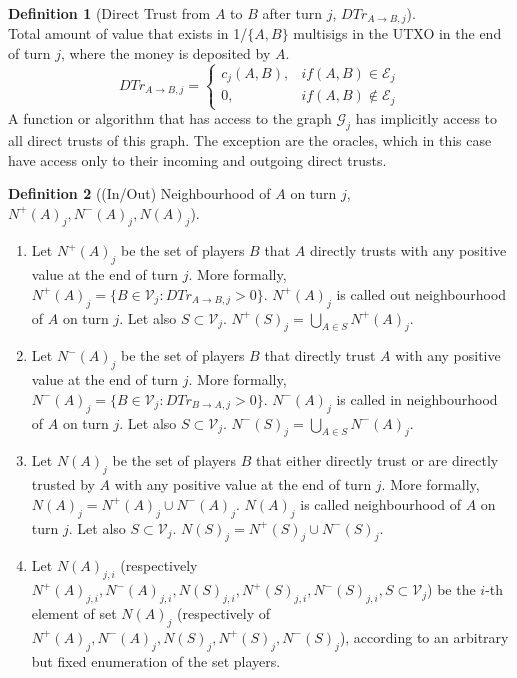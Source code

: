 \documentclass[11pt]{article}
\theoremstyle{definition}
\newtheorem{definition}{Definition}[section]
\theoremstyle{corollary}
\theoremstyle{lemma}
\begin{document}
      \begin{definition}[Direct Trust from $A$ to $B$ after turn $j$, $DTr_{A \rightarrow B, j}$] \ \\
         Total amount of value that exists in 1/$\{A,B\}$ multisigs in the UTXO in the end of turn $j$, where the money is
         deposited by $A$.
         $$DTr_{A \rightarrow B, j} =
            \begin{cases}
               c_j(A, B), & if (A, B) \in \mathcal{E}_j \\
               0, & if (A, B) \notin \mathcal{E}_j
            \end{cases}$$
         A function or algorithm that has access to the graph $\mathcal{G}_j$ has implicitly access to all direct trusts
         of this graph. The exception are the oracles, which in this case have access only to their incoming and outgoing
         direct trusts.
      \end{definition}
      \begin{definition}[(In/Out) Neighbourhood of $A$ on turn $j$, $N^{+}(A)_j, N^{-}(A)_j, N(A)_j$] \ 
         \begin{enumerate}
            \item Let $N^{+}(A)_j$ be the set of players $B$ that $A$ directly trusts with any positive value at the end of
               turn $j$. More formally, $N^{+}(A)_j = \{B \in \mathcal{V}_j : DTr_{A \rightarrow B, j} > 0\}$. $N^{+}(A)_j$
               is called out neighbourhood of $A$ on turn $j$. Let also $S \subset \mathcal{V}_j$. $N^{+}(S)_j =
               \bigcup\limits_{A \in S}N^{+}(A)_j$.
            \item Let $N^{-}(A)_j$ be the set of players $B$ that directly trust $A$ with any positive value at the end of
               turn $j$. More formally, $N^{-}(A)_j = \{B \in \mathcal{V}_j : DTr_{B \rightarrow A, j} > 0\}$. $N^{-}(A)_j$
               is called in neighbourhood of $A$ on turn $j$. Let also $S \subset \mathcal{V}_j$. $N^{-}(S)_j =
               \bigcup\limits_{A \in S}N^{-}(A)_j$.
            \item Let $N(A)_j$ be the set of players $B$ that either directly trust or are directly trusted by $A$ with
               any positive value at the end of turn $j$. More formally, $N(A)_j = N^{+}(A)_j \cup N^{-}(A)_j$. $N(A)_j$ is
               called neighbourhood of $A$ on turn $j$. Let also $S \subset \mathcal{V}_j$.
               $N(S)_j = N^{+}(S)_j \cup N^{-}(S)_j$.
            \item Let $N(A)_{j,i}$ (respectively $N^{+}(A)_{j,i}, N^{-}(A)_{j,i}, N(S)_{j,i}, N^{+}(S)_{j,i}, N^{-}(S)_{j,i},
               S \subset \mathcal{V}_j$) be the $i$-th element of set $N(A)_j$ (respectively of $N^{+}(A)_j, N^{-}(A)_j,
               N(S)_j, N^{+}(S)_j, N^{-}(S)_j$), according to an arbitrary but fixed enumeration of the set players.
         \end{enumerate}
      \end{definition}
\end{document}
